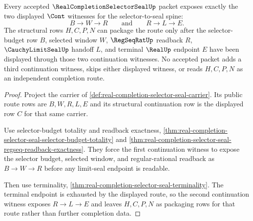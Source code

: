 \begin{theorem}
\label{thm:real-completion-selector-seal-cont-spine-compatibility}
Every accepted $\RealCompletionSelectorSealUp$ packet exposes exactly the two displayed $\Cont$ witnesses for the selector-to-seal spine:
$$
B \to W \to R
\qquad\text{and}\qquad
R \to L \to E.
$$
The structural rows $H,C,P,N$ can package the route only after the selector-budget row $B$, selected window $W$, $\RegSeqRatUp$ readback $R$, $\CauchyLimitSealUp$ handoff $L$, and terminal $\RealUp$ endpoint $E$ have been displayed through those two continuation witnesses. No accepted packet adds a third continuation witness, skips either displayed witness, or reads $H,C,P,N$ as an independent completion route.
\end{theorem}
\begin{proof}
Project the carrier of \autoref{def:real-completion-selector-seal-carrier}. Its public route rows are $B,W,R,L,E$ and its structural continuation row is the displayed row $C$ for that same carrier.

Use selector-budget totality and readback exactness, \autoref{thm:real-completion-selector-seal-selector-budget-totality} and \autoref{thm:real-completion-selector-seal-regseq-readback-exactness}. They force the first continuation witness to expose the selector budget, selected window, and regular-rational readback as $B \to W \to R$ before any limit-seal endpoint is readable.

Then use terminality, \autoref{thm:real-completion-selector-seal-terminality}. The terminal endpoint is exhausted by the displayed route, so the second continuation witness exposes $R \to L \to E$ and leaves $H,C,P,N$ as packaging rows for that route rather than further completion data.
\end{proof}

